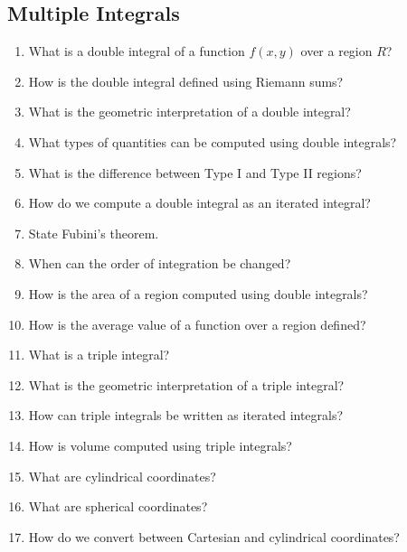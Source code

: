\subsection{Multiple Integrals}

\begin{enumerate}

\item What is a double integral of a function $f(x,y)$ over a region $R$?

\item How is the double integral defined using Riemann sums?

\item What is the geometric interpretation of a double integral?

\item What types of quantities can be computed using double integrals?

\item What is the difference between Type I and Type II regions?

\item How do we compute a double integral as an iterated integral?

\item State Fubini's theorem.

\item When can the order of integration be changed?

\item How is the area of a region computed using double integrals?

\item How is the average value of a function over a region defined?

\item What is a triple integral?

\item What is the geometric interpretation of a triple integral?

\item How can triple integrals be written as iterated integrals?

\item How is volume computed using triple integrals?

\item What are cylindrical coordinates?

\item What are spherical coordinates?

\item How do we convert between Cartesian and cylindrical coordinates?


\end{enumerate}
